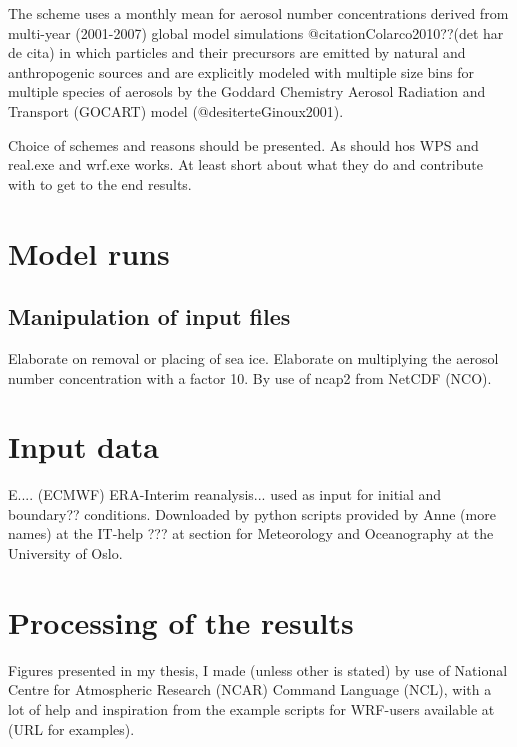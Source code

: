 The scheme uses a monthly mean for aerosol number concentrations derived from multi-year (2001-2007) global model simulations @citationColarco2010??(det har de cita) in which particles and their precursors are emitted by natural and anthropogenic sources and are explicitly modeled with multiple size bins for multiple species of aerosols by the Goddard Chemistry Aerosol Radiation and Transport (GOCART) model (@desiterteGinoux2001).

Choice of schemes and reasons should be presented. As should hos WPS and real.exe and wrf.exe works. At least short about what they do and contribute with to get to the end results.
\section{Model runs}
\subsection{Manipulation of input files}
Elaborate on removal or placing of sea ice. Elaborate on multiplying the aerosol number concentration with a factor 10. By use of ncap2 from NetCDF (NCO).
\section{Input data}
E.... (ECMWF) ERA-Interim reanalysis... used as input for initial and boundary?? conditions. Downloaded by python scripts provided by Anne (more names) at the IT-help ??? at section for Meteorology and Oceanography at the University of Oslo.
\section{Processing of the results}
Figures presented in my thesis, I made (unless other is stated) by use of National Centre for Atmospheric Research (NCAR) Command Language (NCL), with a lot of help and inspiration from the example scripts for WRF-users available at (URL for examples).